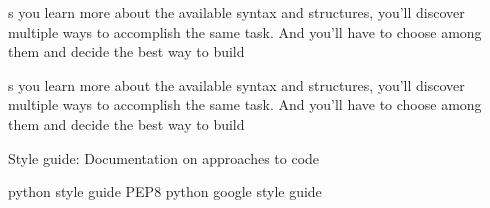 s you learn more about the available syntax and structures, you'll discover multiple ways to accomplish the same task. 
And you'll have to choose among them and decide the best way to build

s you learn more about the available syntax and structures, you'll discover multiple ways to accomplish the same task.
And you'll have to choose among them and decide the best way to build

Style guide: 
  Documentation on approaches to code 

python style guide 
  PEP8 
  python google style guide